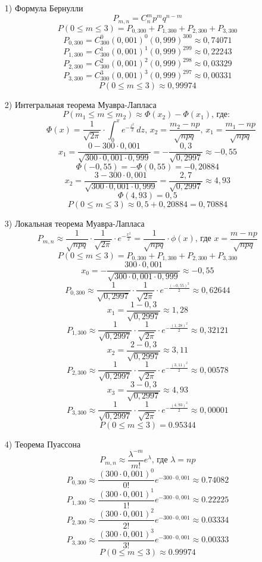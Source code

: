 \documentclass[fleqn, 10pt]{article}
\begin{document}
\begin{enumerate}
\item[1)] Формула Бернулли
  \[P_{m, n} = C_n^mp^mq^{n-m}\]
  \[P(0 \leq m \leq 3) = P_{0,300} + P_{1,300} + P_{2,300} + P_{3,300}\]
  \[P_{0,300} = C_{300}^0(0,001)^0(0,999)^{300} \approx 0,74071\]
  \[P_{1,300} = C_{300}^1(0,001)^1(0,999)^{299} \approx 0,22243\]
  \[P_{2,300} = C_{300}^2(0,001)^2(0,999)^{298} \approx 0,03329\]
  \[P_{3,300} = C_{300}^3(0,001)^3(0,999)^{297} \approx 0,00331\]
  \[P(0 \leq m \leq 3) \approx 0,99974\]
\item[2)] Интегральная теорема Муавра-Лапласа
  \[P(m_1 \leq m \leq m_2) \approx \Phi(x_2) - \Phi(x_1)\text{, где: } \]
  \[\ \ \ \ \Phi(x) = \frac{1}{\sqrt{2\pi}}\cdot\int_0^xe^{-\frac{z^2}{2}}\,dz\text{, } x_2=\frac{m_2-np}{\sqrt{npq}}\text{, } x_1=\frac{m_1-np}{\sqrt{npq}}\]
  \[x_1 = \frac{0 - 300\cdot0,001}{\sqrt{300\cdot0,001\cdot0,999}} = -\frac{0,3}{\sqrt{0,2997}} \approx -0,55\]
  \[\Phi(-0,55) = -\Phi(0,55) = -0,20884\]
  \[x_2 = \frac{3 - 300\cdot0,001}{\sqrt{300\cdot0,001\cdot0,999}} = \frac{2,7}{\sqrt{0,2997}} \approx 4,93\]
  \[\Phi(4,93) = 0,5\]
  \[P(0 \leq m \leq 3) \approx 0,5 + 0,20884 = 0,70884\]
\item[3)] Локальная теорема Муавра-Лапласа
  \[P_{m,n} \approx \frac{1}{\sqrt{npq}}\cdot\frac{1}{\sqrt{2\pi}}\cdot e^{-\frac{x^2}{2}} = \frac{1}{\sqrt{npq}}\cdot\phi(x)\text{, где }x=\frac{m-np}{\sqrt{npq}}\]
  \[P(0 \leq m \leq 3) = P_{0,300} + P_{1,300} + P_{2,300} + P_{3,300}\]
  \[x_0 = -\frac{300\cdot0,001}{\sqrt{300\cdot0,001\cdot0,999}} \approx -0,55\]
  \[P_{0,300} \approx \frac{1}{\sqrt{0,2997}}\cdot\frac{1}{\sqrt{2\pi}}\cdot e^{-\frac{(-0,55)^2}{2}} \approx 0,62644\]
  \[x_1 = \frac{1-0,3}{\sqrt{0,2997}} \approx 1,28\]
  \[P_{1,300} \approx \frac{1}{\sqrt{0,2997}}\cdot\frac{1}{\sqrt{2\pi}}\cdot e^{-\frac{(1,28)^2}{2}} \approx 0,32121\]
  \[x_2 = \frac{2-0,3}{\sqrt{0,2997}} \approx 3,11\]
  \[P_{2,300} \approx \frac{1}{\sqrt{0,2997}}\cdot\frac{1}{\sqrt{2\pi}}\cdot e^{-\frac{(3,11)^2}{2}} \approx 0,00578\]
  \[x_3 = \frac{3-0,3}{\sqrt{0,2997}} \approx 4,93\]
  \[P_{3,300} \approx \frac{1}{\sqrt{0,2997}}\cdot\frac{1}{\sqrt{2\pi}}\cdot e^{-\frac{(4,93)^2}{2}} \approx 0,00001\]
  \[P(0 \leq m \leq 3) = 0.95344\]
\item[4)] Теорема Пуассона
  \[P_{m,n} \approx \frac{\lambda^{-m}}{m!}e^{\lambda} \text{, где } \lambda=np\]
  \[P_{0,300} \approx \frac{(300\cdot0,001)^{0}}{0!}e^{-300\cdot0,001} \approx 0.74082\]
  \[P_{1,300} \approx \frac{(300\cdot0,001)^{1}}{1!}e^{-300\cdot0,001} \approx 0.22225\]
  \[P_{2,300} \approx \frac{(300\cdot0,001)^{2}}{2!}e^{-300\cdot0,001} \approx 0.03334\]
  \[P_{3,300} \approx \frac{(300\cdot0,001)^{3}}{3!}e^{-300\cdot0,001} \approx 0.00333\]
  \[P(0 \leq m \leq 3) \approx 0.99974\]
\end{enumerate}
\end{document}
